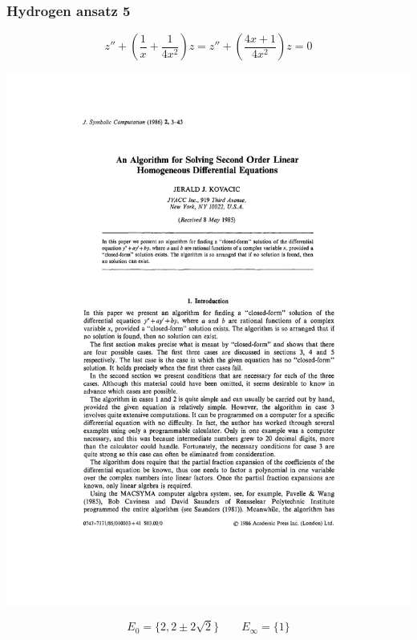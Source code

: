 \documentclass{beamer}
\begin{document}
\begin{frame}[fragile]
\frametitle{Hydrogen ansatz 5}
\small

$$z'' + \left(\frac{1}{x} + \frac{1}{4x^2}\right) z = z'' + \left(\frac{4x + 1}{4x^2}\right) z = 0$$

\includegraphics[page=16,clip,trim=0in 4in 0in 3.6in, width=\textwidth]{Kovacic.pdf}

$$E_0 = \{2, 2\pm2\sqrt{2}\}\qquad E_\infty = \{ 1\} $$

\end{frame}
\end{document}
